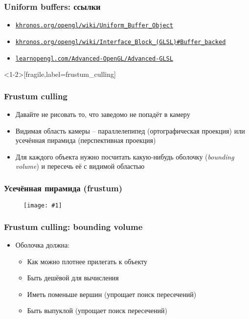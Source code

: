 \documentclass{beamer}
\newcommand{\slideimage}[1]{
  \begin{figure}
    \begin{adjustbox}{width=\textwidth, totalheight=\textheight-2\baselineskip-2\baselineskip,keepaspectratio}
      \texttt{[image: \#1]}
    \end{adjustbox}
  \end{figure}
}
\begin{document}
\begin{frame}[fragile]
\fontsize{10pt}{10pt}
\frametitle{Uniform buffers: ссылки}
\begin{itemize}
\item \href{https://www.khronos.org/opengl/wiki/Uniform_Buffer_Object}{\texttt{khronos.org/opengl/wiki/Uniform\_Buffer\_Object}}
\item \href{https://www.khronos.org/opengl/wiki/Interface_Block_(GLSL)#Buffer_backed}{\texttt{khronos.org/opengl/wiki/Interface\_Block\_(GLSL)\#Buffer\_backed}}
\item \href{https://learnopengl.com/Advanced-OpenGL/Advanced-GLSL}{\texttt{learnopengl.com/Advanced-OpenGL/Advanced-GLSL}}
\end{itemize}
\end{frame}

\begin{frame}<1-2>[fragile,label=frustum_culling]
\frametitle{Frustum culling}
\begin{itemize}
\item Давайте не рисовать то, что заведомо не попадёт в камеру
\pause
\item Видимая область камеры -- параллелепипед (ортографическая проекция) или усечённая пирамида (перспективная проекция)
\pause
\item Для каждого объекта нужно посчитать какую-нибудь оболочку (\textit{bounding volume}) и пересечь её с видимой областью
\end{itemize}
\end{frame}

\begin{frame}[fragile]
\frametitle{Усечённая пирамида (frustum)}
\slideimage{frustum.png}
\end{frame}


\begin{frame}[fragile]
\frametitle{Frustum culling: bounding volume}
\begin{itemize}
\item Оболочка должна:
\begin{itemize}
\pause
\item Как можно плотнее прилегать к объекту
\pause
\item Быть дешёвой для вычисления
\pause
\item Иметь поменьше вершин (упрощает поиск пересечений)
\pause
\item Быть выпуклой (упрощает поиск пересечений)
\end{itemize}
\end{itemize}
\end{frame}
\end{document}
